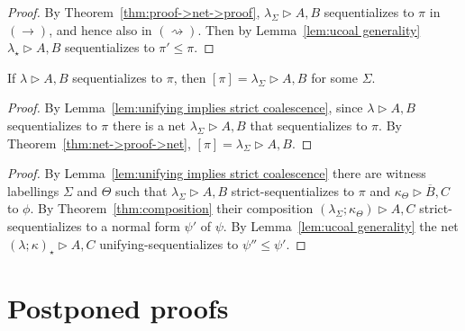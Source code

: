 \documentclass[UKenglish]{lipics-v2016}
\makeatletter
\theoremstyle{plain}
\newcommand\+{+}
\renewcommand\*{\times}
\newcommand\dual[1]{\overline{#1}}
\newcommand\seq[2]{{\vdash}#1,#2}
\newcommand\Seq{\vphantom(\seq}
\newcommand\Prf[3]{\deduce{\Seq{#2}{#3}}{\vphantom(#1}}
\newcommand\net[3]{#1\triangleright #2,#3}
\newcommand\comp{\mathbin;}
\newcommand\scoal{\rightarrow} %
\newcommand\ucoal{\rightsquigarrow}
\newcommand\Qrr{\!\!\scriptstyle\qrr}
\newcommand\qrr[1]{
  \ifx#1+\expandafter\@qrr\else
  \ifx#1*\*\mathrm R\else
  \ifx#1!\forall\mathrm R\else
  \ifx#1?\expandafter\@@qrr\else
  \ifx#11\mathrm{ax}\else
  \ifx#1.\mathrm{cut}\else
  #1\mathrm R
  \fi\fi\fi\fi\fi\fi
}
\newcommand\@qrr[1]{+\mathrm R,#1}
\newcommand\@@qrr[1]{\exists\mathrm R,#1}
\makeatother
\begin{document}
\begin{proof}
By Theorem~\ref{thm:proof->net->proof}, $\net{\lambda_\Sigma}AB$ sequentializes to $\pi$ in $(\scoal)$, and hence also in $(\ucoal)$. Then by Lemma~\ref{lem:ucoal generality} $\net{\lambda_\star}AB$ sequentializes to $\pi'\leq\pi$.
\end{proof}


\begin{theorem}
If $\net\lambda AB$ sequentializes to $\pi$, then $[\pi]=\net{\lambda_\Sigma} AB$ for some $\Sigma$.
\end{theorem}

\begin{proof}
By Lemma~\ref{lem:unifying implies strict coalescence}, since $\net\lambda AB$ sequentializes to $\pi$ there is a net $\net{\lambda_\Sigma} AB$ that sequentializes to $\pi$. By Theorem~\ref{thm:net->proof->net}, $[\pi]=\net{\lambda_\Sigma} AB$.
\end{proof}



\begin{proof}
By Lemma~\ref{lem:unifying implies strict coalescence} there are witness labellings $\Sigma$ and $\Theta$ such that $\net{\lambda_\Sigma}AB$ strict-sequentializes to $\pi$ and $\net{\kappa_\Theta}{\dual B}C$ to $\phi$. By Theorem~\ref{thm:composition} their composition $(\net{\lambda_\Sigma\comp\kappa_\Theta)}AC$ strict-sequentializes to a normal form $\psi'$ of $\psi$. By Lemma~\ref{lem:ucoal generality} the net $\net{(\lambda\comp\kappa)_\star}AC$ unifying-sequentializes to $\psi''\leq\psi'$.
\end{proof}






\newpage
\appendix

\section{Postponed proofs}
\end{document}
